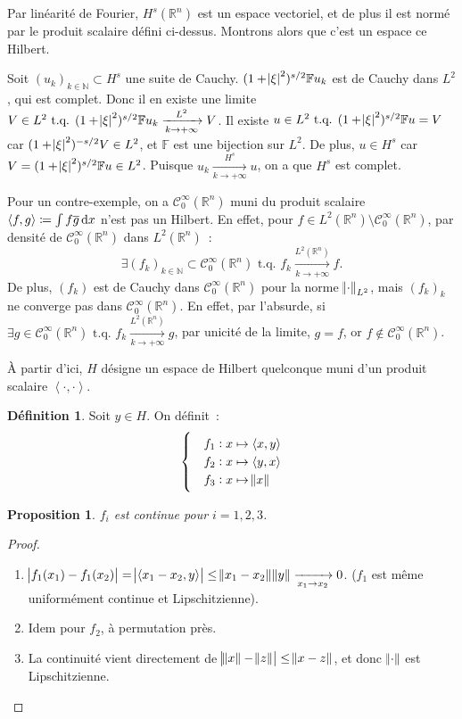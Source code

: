 \documentclass{report}
\newcommand{\R}{{\mathbb R}}
\newcommand{\N}{{\mathbb N}}
\newcommand{\scpr}[2]{\left\langle#1, #2\right\rangle}
\newcommand{\tq}{\text{ t.q. }}
\newcommand{\pinfty}{{+\infty}}
\newcommand{\dx}{\dif x}
\newtheorem{prp}[thm]{Proposition}
\theoremstyle{definition}
\newtheorem{déf}[thm]{Définition}
\theoremstyle{remark}
\begin{document}
Par linéarité de Fourier, $H^s(\R^n)$ est un espace vectoriel, et de plus il est normé par le produit scalaire défini ci-dessus. Montrons alors que c'est un espace ce Hilbert.

Soit $(u_k)_{k \in \N} \subset H^s$ une suite de Cauchy. $(1+\abs\xi^2)^{s/2}\mathbb Fu_k$ est de Cauchy dans $L^2$, qui est complet. Donc il en existe une limite
$V \in L^2 \tq (1+\abs\xi^2)^{s/2}\mathbb Fu_k \xrightarrow[k \to \pinfty]{L^2} V$. Il existe $u \in L^2 \tq (1+\abs\xi^2)^{s/2}\mathbb Fu = V$ car $(1+\abs\xi^2)^{-s/2}V \in L^2$,
et $\mathbb F$ est une bijection sur $L^2$. De plus, $u \in H^s$ car $V = (1+\abs\xi^2)^{s/2}\mathbb Fu \in L^2$. Puisque $u_k \xrightarrow[k \to \pinfty]{H^s} u$,
on a que $H^s$ est complet.

Pour un contre-exemple, on a $\mathcal C^\infty_0(\R^n)$ muni du produit scalaire $\scpr fg \coloneqq \int f\overline g\dx$ n'est pas un Hilbert. En effet, pour
$f \in L^2(\R^n) \setminus \mathcal C^\infty_0(\R^n)$, par densité de $\mathcal C^\infty_0(\R^n)$ dans $L^2(\R^n)$~:
\[\exists (f_k)_{k \in \N} \subset \mathcal C^\infty_0(\R^n) \tq f_k \xrightarrow[k \to \pinfty]{L^2(\R^n)} f.\]
De plus, $(f_k)$ est de Cauchy dans $\mathcal C^\infty_0(\R^n)$ pour la norme $\norm \cdot_{L^2}$, mais $(f_k)_k$ ne converge pas dans $\mathcal C^\infty_0(\R^n)$. En effet, par l'absurde, si
$\exists g \in \mathcal C^\infty_0(\R^n) \tq f_k \xrightarrow[k \to \pinfty]{L^2(\R^n)} g$, par unicité de la limite, $g=f$, or $f \not \in \mathcal C^\infty_0(\R^n)$.

À partir d'ici, $H$ désigne un espace de Hilbert quelconque muni d'un produit scalaire $\scpr \cdot\cdot$.

\begin{déf} Soit $y \in H$. On définit~:
\[\begin{cases}
	&f_1 : x \mapsto \scpr xy \\
	&f_2 : x \mapsto \scpr yx \\
	&f_3 : x \mapsto \norm x
\end{cases}\]
\end{déf}

\begin{prp} $f_i$ est continue pour $i=1,2,3$.
\end{prp}

\begin{proof}~
\begin{enumerate}
	\item $\abs {f_1(x_1) - f_1(x_2)} = \abs {\scpr {x_1-x_2}y} \leq \norm {x_1-x_2}\norm y \xrightarrow[x_1 \to x_2]{} 0$. ($f_1$ est même uniformément continue et Lipschitzienne).
	\item Idem pour $f_2$, à permutation près.
	\item La continuité vient directement de $\abs {\norm x-\norm z} \leq \norm {x-z}$, et donc $\norm \cdot$ est Lipschitzienne.
\end{enumerate}
\end{proof}
\end{document}
